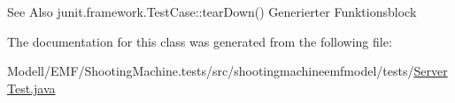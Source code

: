 \begin{DoxySeeAlso}{See Also}
junit.\-framework.\-Test\-Case\-::tear\-Down() Generierter Funktionsblock 
\end{DoxySeeAlso}


The documentation for this class was generated from the following file\-:\begin{DoxyCompactItemize}
\item 
Modell/\-E\-M\-F/\-Shooting\-Machine.\-tests/src/shootingmachineemfmodel/tests/\hyperlink{_server_test_8java}{Server\-Test.\-java}\end{DoxyCompactItemize}
